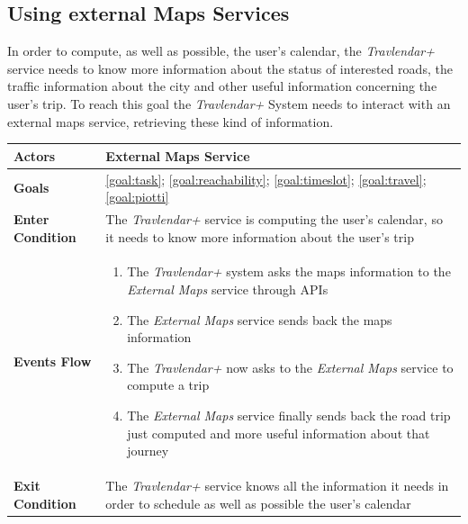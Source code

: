 \subsection{Using external Maps Services}
In order to compute, as well as possible, the user's calendar, the \emph{Travlendar+} service needs to know more information about the status of interested roads, the traffic information about the city and other useful information concerning the user's trip.
To reach this goal the \emph{Travlendar+} System needs to interact with an external maps service, retrieving these kind of information.

\begin{table}[H]
	\centering
    
    \begin{tabular}{|p{3.5cm}|p{10.3cm}|}
    
    \hline
    \textbf{\large{Actors}}  			& \tabitem External Maps Service\\
    
    \hline
    \textbf{\large{Goals}} 				& \ref{goal:task}; \ref{goal:reachability}; \ref{goal:timeslot}; \ref{goal:travel}; \ref{goal:piotti}\\
    
    \hline
    \textbf{\large{Enter Condition}}	& The \emph{Travlendar+} service is computing the user's calendar, so it needs to know more information about the user's trip\\
    
    \hline
    \textbf{\large{Events Flow}}		& \begin{enumerate}[leftmargin=0.5cm]
                                          	\item The \emph{Travlendar+} system asks the maps information to the \emph{External Maps} service through APIs
                                          	\item The \emph{External Maps} service sends back the maps information
                                          	\item The \emph{Travlendar+} now asks to the \emph{External Maps} service to compute a trip
                                          	\item The \emph{External Maps} service finally sends back the road trip just computed and more useful information about that journey
                                          \end{enumerate}
    										\\
    \hline
    \textbf{\large{Exit Condition}} 	& The \emph{Travlendar+} service knows all the information it needs in order to schedule as well as possible the user's calendar\\
    

\end{tabular}
\end{table}

